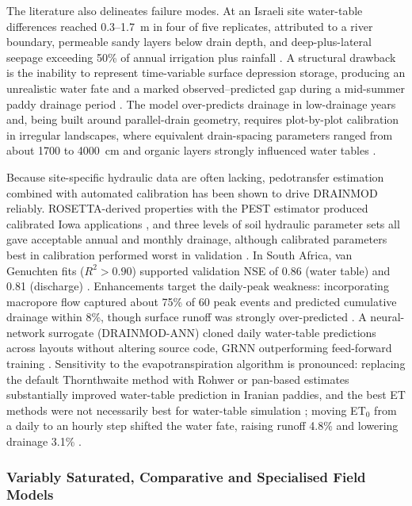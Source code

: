 \documentclass[11pt]{article}
\begin{document}
The literature also delineates failure modes. At an Israeli site water-table differences reached 0.3--1.7~m in four of five replicates, attributed to a river boundary, permeable sandy layers below drain depth, and deep-plus-lateral seepage exceeding 50\% of annual irrigation plus rainfall \parencite{Sinai2006}. A structural drawback is the inability to represent time-variable surface depression storage, producing an unrealistic water fate and a marked observed--predicted gap during a mid-summer paddy drainage period \parencite{Abduljaleel2023}. The model over-predicts drainage in low-drainage years \parencite{Singh2006b} and, being built around parallel-drain geometry, requires plot-by-plot calibration in irregular landscapes, where equivalent drain-spacing parameters ranged from about 1700 to 4000~cm and organic layers strongly influenced water tables \parencite{He2002}.

Because site-specific hydraulic data are often lacking, pedotransfer estimation combined with automated calibration has been shown to drive \textsc{DRAINMOD} reliably. ROSETTA-derived properties with the PEST estimator produced calibrated Iowa applications \parencite{Singh2006b}, and three levels of soil hydraulic parameter sets all gave acceptable annual and monthly drainage, although calibrated parameters best in calibration performed worst in validation \parencite{Qi2015}. In South Africa, van Genuchten fits ($R^2>0.90$) supported validation NSE of 0.86 (water table) and 0.81 (discharge) \parencite{Malota2024,Malota2015}. Enhancements target the daily-peak weakness: incorporating macropore flow captured about 75\% of 60 peak events and predicted cumulative drainage within 8\%, though surface runoff was strongly over-predicted \parencite{Askar2020}. A neural-network surrogate (\textsc{DRAINMOD-ANN}) cloned daily water-table predictions across layouts without altering source code, GRNN outperforming feed-forward training \parencite{Awad2022,Awad2022b}. Sensitivity to the evapotranspiration algorithm is pronounced: replacing the default Thornthwaite method with Rohwer or pan-based estimates substantially improved water-table prediction in Iranian paddies, and the best ET methods were not necessarily best for water-table simulation \parencite{Malakshahi2020}; moving ET$_0$ from a daily to an hourly step shifted the water fate, raising runoff 4.8\% and lowering drainage 3.1\% \parencite{Awad2022b}.

\subsubsection{Variably Saturated, Comparative and Specialised Field Models}
\end{document}
